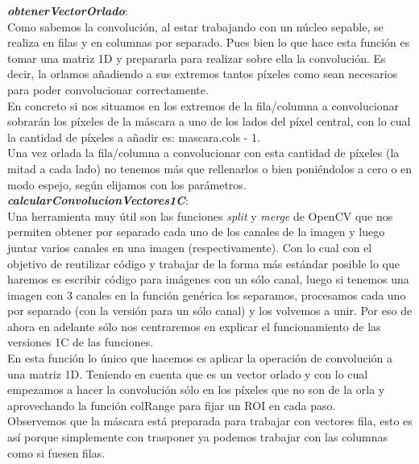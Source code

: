 \documentclass[10pt,a4paper]{article}
\begin{document}
\textbf{\textit{obtenerVectorOrlado}}:\\

Como sabemos la convolución, al estar trabajando con un núcleo sepable, se realiza en filas y en columnas por separado. Pues bien lo que hace esta función es tomar una matriz 1D y prepararla para realizar sobre ella la convolución. Es decir, la orlamos añadiendo a sus extremos tantos píxeles como sean necesarios para poder convolucionar correctamente.\\

En concreto si nos situamos en los extremos de la fila/columna a convolucionar sobrarán los píxeles de la máscara a uno de los lados del píxel central, con lo cual la cantidad de píxeles a añadir es: mascara.cols - 1.\\

Una vez orlada la fila/columna a convolucionar con esta cantidad de píxeles (la mitad a cada lado) no tenemos más que rellenarlos o bien poniéndolos a cero o en modo espejo, según elijamos con los parámetros.\\

\textbf{\textit{calcularConvolucionVectores1C}}:\\

Una herramienta muy útil son las funciones \textit{split} y \textit{merge} de OpenCV que nos permiten obtener por separado cada uno de los canales de la imagen y luego juntar varios canales en una imagen (respectivamente). Con lo cual con el objetivo de reutilizar código y trabajar de la forma más estándar posible lo que haremos es escribir código para imágenes con un sólo canal, luego si tenemos una imagen con 3 canales en la función genérica los separamos, procesamos cada uno por separado (con la versión para un sólo canal) y los volvemos a unir. Por eso de ahora en adelante sólo nos centraremos en explicar el funcionamiento de las versiones 1C de las funciones.\\

En esta función lo único que hacemos es aplicar la operación de convolución a una matriz 1D. Teniendo en cuenta que es un vector orlado y con lo cual empezamos a hacer la convolución sólo en los píxeles que no son de la orla y aprovechando la función colRange para fijar un ROI en cada paso.\\

Observemos que la máscara está preparada para trabajar con vectores fila, esto es así porque simplemente con trasponer ya podemos trabajar con las columnas como si fuesen filas.\\
\end{document}
